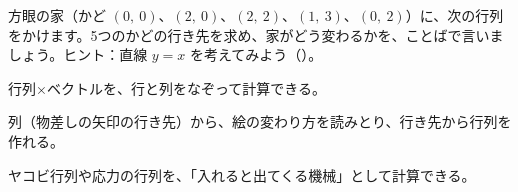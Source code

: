 \bkproblem 方眼の家（かど $(0,\ 0)$、$(2,\ 0)$、$(2,\ 2)$、$(1,\ 3)$、$(0,\ 2)$）に、次の行列をかけます。5つのかどの行き先を求め、家がどう変わるかを、ことばで言いましょう。ヒント：直線 $y=x$ を考えてみよう\mbox{（）}。

\begin{furikaeri}
\begin{checklist}
\item 行列×ベクトルを、行と列をなぞって計算できる。
\item 列（物差しの矢印の行き先）から、絵の変わり方を読みとり、行き先から行列を作れる。
\item ヤコビ行列や応力の行列を、「入れると出てくる機械」として計算できる。
\end{checklist}
\end{furikaeri}

